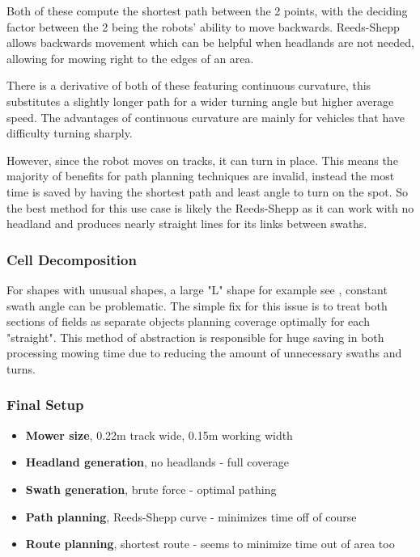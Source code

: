 \documentclass[final]{cmpreport_02}
\begin{document}

Both of these compute the shortest path between the 2 points, with the deciding factor between the 2 being the robots' ability to move backwards.
Reeds-Shepp allows backwards movement which can be helpful when headlands are not needed, allowing for mowing right to the edges of an area.

There is a derivative of both of these featuring continuous curvature, this substitutes a slightly longer path for a wider turning angle but higher average speed.
The advantages of continuous curvature are mainly for vehicles that have difficulty turning sharply.

However, since the robot moves on tracks, it can turn in place.
This means the majority of benefits for path planning techniques are invalid, instead the most time is saved by having the shortest path and least angle to turn on the spot.
So the best method for this use case is likely the Reeds-Shepp as it can work with no headland and produces nearly straight lines for its links between swaths.


\subsubsection{Cell Decomposition}
For shapes with unusual shapes, a large "L" shape for example see , constant swath angle can be problematic.
The simple fix for this issue is to treat both sections of fields as separate objects planning coverage optimally for each "straight".
This method of abstraction is responsible for huge saving in both processing mowing time due to reducing the amount of unnecessary swaths and turns.

\subsubsection{Final Setup}

\begin{itemize}
	\item{\textbf{Mower size}, 0.22m track wide, 0.15m working width}
	\item{\textbf{Headland generation}, no headlands - full coverage}
	\item{\textbf{Swath generation}, brute force - optimal pathing}
	\item{\textbf{Path planning}, Reeds-Shepp curve - minimizes time off of course}
	\item{\textbf{Route planning}, shortest route - seems to minimize time out of area too}
\end{itemize}
\end{document}
